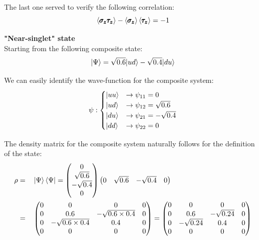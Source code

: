 \documentclass[solutions.tex]{subfiles}
\begin{document}
The last one served to verify the following correlation:
\[
	\left\langle \pmb{\sigma_z\tau_z} \right\rangle - \left\langle \pmb{\sigma_z} \right\rangle\left\langle \pmb{\tau_z} \right\rangle = -1
\]

\hr

\textbf{"Near-singlet" state}\ \\
Starting from the following composite state:
\[
	|\Psi\rangle = \sqrt{0.6}|ud\rangle - \sqrt{0.4}|du\rangle
\]

We can easily identify the wave-function for the composite system:
\[
	\psi : \begin{cases}
		|uu\rangle &\rightarrow \psi_{11} = 0 \\
		|ud\rangle &\rightarrow \psi_{12} = \sqrt{0.6} \\
		|du\rangle &\rightarrow \psi_{21} = -\sqrt{0.4} \\
		|dd\rangle &\rightarrow \psi_{22} = 0 \\
	\end{cases}
\]

The density matrix for the composite system naturally follows
for the definition of the state:
\begin{equation*}\begin{aligned}
	\rho &=&& \left| \Psi \right\rangle\left\langle \Psi \right| = \begin{pmatrix}
		0 \\
		\sqrt{0.6} \\
		-\sqrt{0.4} \\
		0 \\
	\end{pmatrix}\begin{pmatrix}
		0 & \sqrt{0.6} & -\sqrt{0.4} & 0 \\
	\end{pmatrix} \\
	~ &=&& \begin{pmatrix}
		0 & 0                    & 0                    & 0 \\
		0 & 0.6                  & -\sqrt{0.6\times0.4} & 0 \\
		0 & -\sqrt{0.6\times0.4} & 0.4                  & 0 \\
		0 & 0                    & 0                    & 0 \\
	\end{pmatrix} = \begin{pmatrix}
		0 & 0            & 0            & 0 \\
		0 & 0.6          & -\sqrt{0.24} & 0 \\
		0 & -\sqrt{0.24} & 0.4          & 0 \\
		0 & 0            & 0            & 0 \\
	\end{pmatrix}
\end{aligned}\end{equation*}
\end{document}
